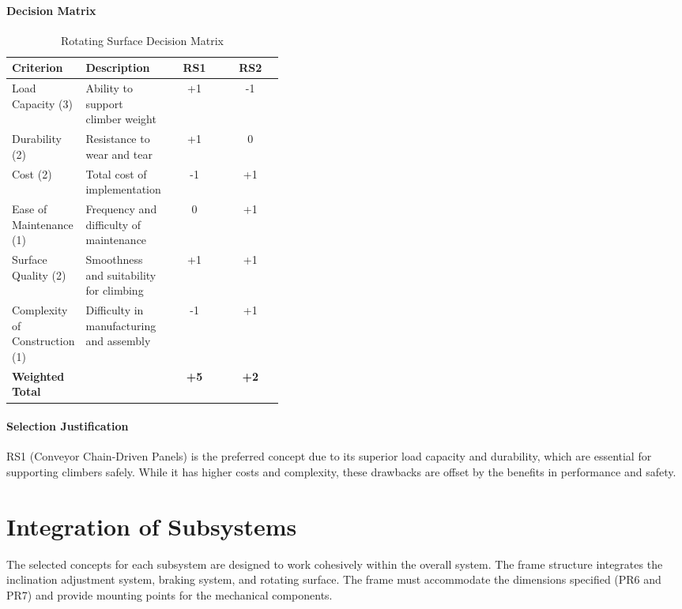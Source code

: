 \paragraph{Decision Matrix}

\begin{table}[H]
\centering
\caption{Rotating Surface Decision Matrix}
\label{tab:rs_decision_matrix}
\begin{tabular}{|p{0.1\linewidth}|p{0.3\linewidth}|c|c|}
\hline
\textbf{Criterion} & \textbf{Description} & \textbf{RS1} & \textbf{RS2} \\
\hline
Load Capacity (3) & Ability to support climber weight & +1 & -1 \\
\hline
Durability (2) & Resistance to wear and tear & +1 & 0 \\
\hline
Cost (2) & Total cost of implementation & -1 & +1 \\
\hline
Ease of Maintenance (1) & Frequency and difficulty of maintenance & 0 & +1 \\
\hline
Surface Quality (2) & Smoothness and suitability for climbing & +1 & +1 \\
\hline
Complexity of Construction (1) & Difficulty in manufacturing and assembly & -1 & +1 \\
\hline
\textbf{Weighted Total} &  & \textbf{+5} & \textbf{+2} \\
\hline
\end{tabular}
\end{table}

\paragraph{Selection Justification}

RS1 (Conveyor Chain-Driven Panels) is the preferred concept due to its superior load capacity and durability, which are essential for supporting climbers safely. While it has higher costs and complexity, these drawbacks are offset by the benefits in performance and safety.

\section{Integration of Subsystems}

The selected concepts for each subsystem are designed to work cohesively within the overall system. The frame structure integrates the inclination adjustment system, braking system, and rotating surface. The frame must accommodate the dimensions specified (PR6 and PR7) and provide mounting points for the mechanical components.

